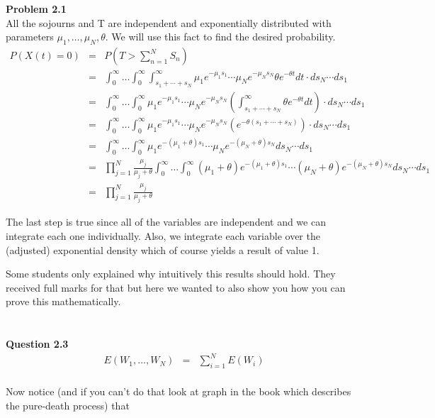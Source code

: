 \documentclass[10pt,a4paper]{article}
\begin{document}
\begin{flushleft}
\textbf{Problem 2.1}\\
All the sojourns and T are independent and exponentially
distributed with parameters $\mu_1,\ldots,\mu_N,\theta$. We will
use this fact to find the desired probability.
\begin{eqnarray*}
P(X(t)=0)&=& P(T>\sum_{n=1}^N S_n)\\
&=&\int_0^\infty \ldots \int_0^\infty \int_{s_1+\cdots+s_N}^\infty
\mu_1 e^{-\mu_1 s_1} \cdots \mu_N e^{-\mu_N s_N}\theta e^{-\theta
t} dt \cdot ds_N \cdots ds_1\\
&=&\int_0^\infty \ldots \int_0^\infty \mu_1 e^{-\mu_1 s_1} \cdots
\mu_N e^{-\mu_N s_N} (\int_{s_1+\cdots+s_N}^\infty \theta
e^{-\theta t} dt )\cdot ds_N \cdots ds_1\\
&=&\int_0^\infty \ldots \int_0^\infty \mu_1 e^{-\mu_1 s_1} \cdots
\mu_N e^{-\mu_N s_N} (e^{-\theta (s_1+\cdots+s_N)}) \cdot ds_N \cdots ds_1\\
&=&\int_0^\infty \ldots \int_0^\infty \mu_1 e^{-(\mu_1+\theta)
s_1} \cdots \mu_N e^{-(\mu_N+\theta) s_N} ds_N \cdots ds_1\\
&=&\prod_{j=1}^N \frac{\mu_j}{\mu_j+\theta} \int_0^\infty \ldots
\int_0^\infty (\mu_1+\theta) e^{-(\mu_1+\theta)
s_1} \cdots (\mu_N+\theta) e^{-(\mu_N+\theta) s_N} ds_N \cdots ds_1\\
&=&\prod_{j=1}^N \frac{\mu_j}{\mu_j+\theta}
\end{eqnarray*}

The last step is true since all of the variables are independent
and we can integrate each one individually. Also, we integrate
each variable over the (adjusted) exponential density which of
course yields a result of value 1.

Some students only explained why intuitively this results should
hold. They received full marks for that but here we wanted to also
show you how you can prove this mathematically.

\begin{eqnarray*}
\\
\end{eqnarray*}


\textbf{Question 2.3}\\

\begin{eqnarray*}
E(W_1,\ldots,W_N)&=& \sum_{i=1}^N E(W_i)\\
\end{eqnarray*}

Now notice (and if you can't do that look at graph in the book
which describes the pure-death process) that


\end{flushleft}
\end{document}
